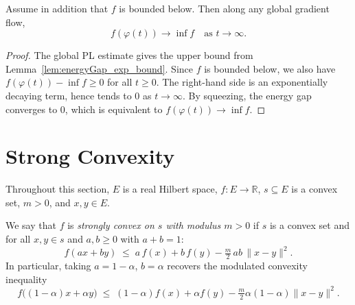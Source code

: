 \begin{theorem}\label{thm:gradientFlow_PL_tendsto}
  \leanok{}
  Assume in addition that $f$ is bounded below. Then along any global gradient flow,
  \[
    f(\varphi(t)) \to \inf f \quad \text{as } t\to\infty.
  \]
\end{theorem}

\begin{proof}
  \leanok{}
  The global PL estimate gives the upper bound from Lemma~\ref{lem:energyGap_exp_bound}. Since $f$ is bounded below,
  we also have $f(\varphi(t)) - \inf f\ge 0$ for all $t\ge 0$.
  The right-hand side is an exponentially decaying term, hence tends to $0$ as $t\to\infty$.
  By squeezing, the energy gap converges to $0$, which is equivalent to $f(\varphi(t))\to \inf f$.
\end{proof}


\chapter{Strong Convexity}\label{sec:strong_convexity}

Throughout this section, $E$ is a real Hilbert space, $f : E \to \mathbb{R}$,
$s \subseteq E$ is a convex set, $m > 0$, and $x, y \in E$.


\begin{definition}\label{def:strong_convex_fn}
  \leanok{}
  We say that $f$ is \emph{strongly convex on $s$ with modulus $m > 0$} if $s$ is a convex set
  and for all $x, y \in s$ and $a, b \ge 0$ with $a + b = 1$:
  \[
    f(a x + b y) \;\le\; a\,f(x) + b\,f(y) - \tfrac{m}{2}\,ab\,\|x - y\|^2.
  \]
  In particular, taking $a = 1-\alpha$, $b = \alpha$ recovers the modulated convexity inequality
  \[
    f\bigl((1-\alpha)x + \alpha y\bigr) \;\le\; (1-\alpha)f(x) + \alpha f(y) - \tfrac{m}{2}\alpha(1-\alpha)\|x-y\|^2.
  \]
\end{definition}


